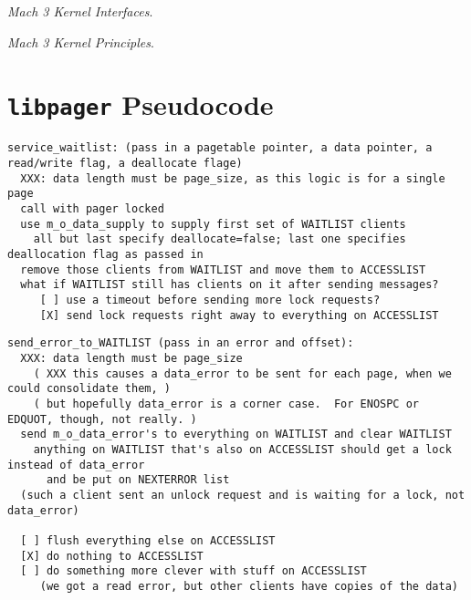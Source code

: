 \documentclass{article}
\def\libpager{{\tt libpager}\xspace}
\begin{document}
\begin{thebibliography}{9}

 {\it Mach 3 Kernel Interfaces}.

 {\it Mach 3 Kernel Principles}.

\end{thebibliography}

\appendix

\section{\libpager Pseudocode}

\begin{verbatim}
service_waitlist: (pass in a pagetable pointer, a data pointer, a read/write flag, a deallocate flage)
  XXX: data length must be page_size, as this logic is for a single page
  call with pager locked
  use m_o_data_supply to supply first set of WAITLIST clients
    all but last specify deallocate=false; last one specifies deallocation flag as passed in
  remove those clients from WAITLIST and move them to ACCESSLIST
  what if WAITLIST still has clients on it after sending messages?
     [ ] use a timeout before sending more lock requests?
     [X] send lock requests right away to everything on ACCESSLIST
\end{verbatim}

\begin{verbatim}
send_error_to_WAITLIST (pass in an error and offset):
  XXX: data length must be page_size
    ( XXX this causes a data_error to be sent for each page, when we could consolidate them, )
    ( but hopefully data_error is a corner case.  For ENOSPC or EDQUOT, though, not really. )
  send m_o_data_error's to everything on WAITLIST and clear WAITLIST
    anything on WAITLIST that's also on ACCESSLIST should get a lock instead of data_error
      and be put on NEXTERROR list
  (such a client sent an unlock request and is waiting for a lock, not data_error)

  [ ] flush everything else on ACCESSLIST
  [X] do nothing to ACCESSLIST
  [ ] do something more clever with stuff on ACCESSLIST
     (we got a read error, but other clients have copies of the data)
\end{verbatim}
\end{document}

